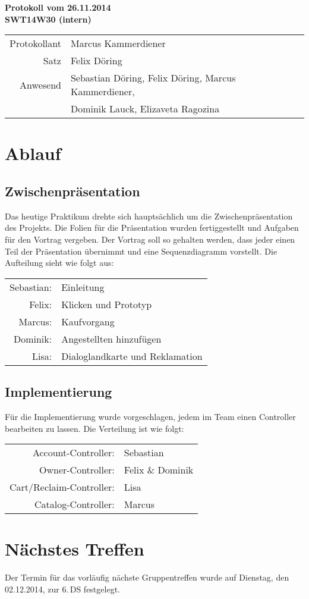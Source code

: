 \documentclass{scrartcl}
\begin{document}
\begin{center}
\LARGE \bf{Protokoll vom 26.11.2014 \\
SWT14W30 (intern)}
\end{center}

\begin{tabular}{rp{10cm}}
Protokollant & Marcus Kammerdiener \\
Satz & Felix Döring \\
Anwesend & Sebastian Döring, Felix Döring, Marcus Kammerdiener,\\
& Dominik Lauck, Elizaveta Ragozina \\
\end{tabular}

\vspace*{3em}

\section{Ablauf}
\subsection{Zwischenpräsentation}
Das heutige Praktikum drehte sich hauptsächlich um die Zwischenpräsentation des Projekts. Die Folien für die Präsentation wurden fertiggestellt und Aufgaben für den Vortrag vergeben. Der Vortrag soll so gehalten werden, dass jeder einen Teil der Präsentation übernimmt und eine Sequenzdiagramm vorstellt. Die Aufteilung sieht wie folgt aus:\\[.5cm]
\begin{tabular}{rp{10cm}}
Sebastian: & Einleitung\\
Felix: & Klicken und Prototyp\\
Marcus: & Kaufvorgang\\
Dominik: & Angestellten hinzufügen\\
Lisa: & Dialoglandkarte und Reklamation\\
\end{tabular}
\subsection{Implementierung}
Für die Implementierung wurde vorgeschlagen, jedem im Team einen Controller bearbeiten zu lassen. Die
Verteilung ist wie folgt:\\[.5cm]
\begin{tabular}{rp{10cm}}
Account-Controller: & Sebastian\\
Owner-Controller: & Felix \& Dominik\\
Cart/Reclaim-Controller: & Lisa\\
Catalog-Controller: & Marcus\\
\end{tabular}
\vspace*{1em}

\section{N\"achstes Treffen}
Der Termin für das vorläufig nächste Gruppentreffen wurde auf Dienstag, den 02.12.2014, zur 6.\,DS festgelegt.
\end{document}
